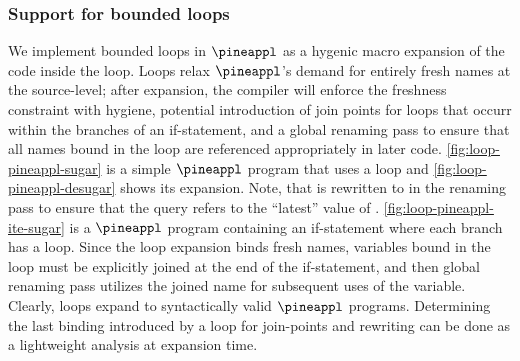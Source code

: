 \subsubsection{Support for bounded loops}
We implement bounded loops in $\pineappl$ as a hygenic macro expansion of the
code inside the loop. Loops relax $\pineappl$'s demand for entirely fresh names
at the source-level; after expansion, the compiler will enforce the freshness
constraint with hygiene, potential introduction of join points for loops that
occurr within the branches of an if-statement, and a global renaming pass to
ensure that all names bound in the loop are referenced appropriately in later
code. \cref{fig:loop-pineappl-sugar} is a simple $\pineappl$ program that uses
a loop and \cref{fig:loop-pineappl-desugar} shows its expansion. Note, that
 is rewritten to  in the renaming pass
to ensure that the query refers to the ``latest'' value of .
\cref{fig:loop-pineappl-ite-sugar} is a $\pineappl$ program containing an
if-statement where each branch has a loop. Since the loop expansion binds fresh
names, variables bound in the loop must be explicitly joined at the end of the
if-statement, and then global renaming pass utilizes the joined name for
subsequent uses of the variable.  Clearly, loops expand to syntactically valid
$\pineappl$ programs. Determining the last binding introduced by a loop for
join-points and rewriting can be done as a lightweight analysis at expansion time.

